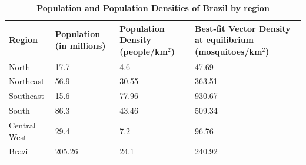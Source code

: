 \documentclass[10pt,letterpaper]{article}
\begin{document}
    

\begin{table}
    \centering
    \caption{\textbf{Population and Population Densities of Brazil by region}}
    \begin{tabular}{|l|p{1in}|p{1.4in}|p{1.38in}|} \hline
     \textbf{Region }  &  \textbf{Population (in millions)} & \textbf{Population Density (people/km$^2$)} & \textbf{Best-fit Vector Density at equilibrium (mosquitoes/km$^2$)}\\ \hline
     North    & 17.7 &4.6&47.69\\\hline
     Northeast &56.9&30.55&363.51\\\hline
     Southeast&15.6&77.96&930.67\\\hline
     South&86.3&43.46&509.34\\\hline
     Central West&29.4&7.2&96.76\\\hline \hline
     Brazil &205.26&24.1&240.92\\\hline
    \end{tabular}
    
    \label{tab:zika_pop}
\end{table}
\end{document}
